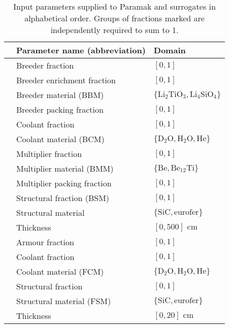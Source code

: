 \begin{table}[t]
	\setlength\tabcolsep{2pt}
	\renewcommand{\arraystretch}{0.95}
	\caption{\label{tbl:params}Input parameters supplied to Paramak and surrogates in alphabetical order. Groups of fractions marked\textsuperscript{\textdagger
		\textdaggerdbl} are independently required to sum to 1.}
	\begin{indented}
	\item[]
		\begin{tabular}{l|ll}
		\toprule
		{} & Parameter name (abbreviation) & Domain\\
		\midrule
		\parbox[t]{2mm}{\hspace{-2pt}}
		   & Breeder fraction\textsuperscript{\textdagger} & $[0,1]$\\
		   & Breeder  enrichment fraction & $[0,1]$\\
		   & Breeder material (BBM) & $\{\text{Li}_2\text{TiO}_3, \text{Li}_4\text{SiO}_4\}$\\
		   & Breeder packing fraction & $[0,1]$\\
		   & Coolant fraction\textsuperscript{\textdagger} & $[0,1]$\\
		   & Coolant material (BCM) & $\{\text{D}_2\text{O}, \text{H}_2\text{O}, \text{He}\}$\\
		   & Multiplier fraction\textsuperscript{\textdagger} & $[0,1]$\\
		   & Multiplier material (BMM) & $\{\text{Be}, \text{Be}_{12}\text{Ti}\}$\\
		   & Multiplier packing fraction & $[0,1]$\\
		   & Structural fraction\textsuperscript{\textdagger} (BSM) & $[0,1]$\\
		   & Structural material & $\{\text{SiC}, \text{eurofer}\}$\\
		   & Thickness & $[0,500]\text{ cm}$\\
		\midrule
		\parbox[t]{2mm}{\hspace{-2pt}}
		   & Armour fraction\textsuperscript{\textdaggerdbl} & $[0,1]$\\
		   & Coolant fraction\textsuperscript{\textdaggerdbl} & $[0,1]$\\
		   & Coolant material (FCM) & $\{\text{D}_2\text{O}, \text{H}_2\text{O}, \text{He}\}$\\
		   & Structural fraction\textsuperscript{\textdaggerdbl} & $[0,1]$\\
		   & Structural material (FSM) & $\{\text{SiC}, \text{eurofer}\}$\\
		   & Thickness & $[0,20]\text{ cm}$\\
		\bottomrule
		\end{tabular}
	\end{indented}
\end{table}

